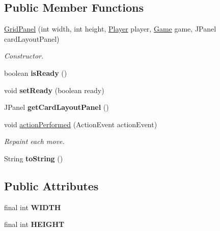 \subsection*{Public Member Functions}
\begin{DoxyCompactItemize}
\item 
\hyperlink{classGridPanel_a0b8f0e5a4913536e371ae84517bec8f7}{Grid\+Panel} (int width, int height, \hyperlink{classPlayer}{Player} player, \hyperlink{classGame}{Game} game, J\+Panel card\+Layout\+Panel)
\begin{DoxyCompactList}\small\item\em Constructor. \end{DoxyCompactList}\item 
boolean {\bfseries is\+Ready} ()\hypertarget{classGridPanel_aae632b11eaed927afd5884f99a5870f8}{}\label{classGridPanel_aae632b11eaed927afd5884f99a5870f8}

\item 
void {\bfseries set\+Ready} (boolean ready)\hypertarget{classGridPanel_a09c32b26eae81ac799aa95e28aae194f}{}\label{classGridPanel_a09c32b26eae81ac799aa95e28aae194f}

\item 
J\+Panel {\bfseries get\+Card\+Layout\+Panel} ()\hypertarget{classGridPanel_a1a8601fc7d4f8175c7aebd6bec8ec6f9}{}\label{classGridPanel_a1a8601fc7d4f8175c7aebd6bec8ec6f9}

\item 
void \hyperlink{classGridPanel_a38f9375b4ed14fa70edaa859b0ed43e6}{action\+Performed} (Action\+Event action\+Event)\hypertarget{classGridPanel_a38f9375b4ed14fa70edaa859b0ed43e6}{}\label{classGridPanel_a38f9375b4ed14fa70edaa859b0ed43e6}

\begin{DoxyCompactList}\small\item\em Repaint each move. \end{DoxyCompactList}\item 
String {\bfseries to\+String} ()\hypertarget{classGridPanel_a7dbc1ff2bf786538707f479837ce2792}{}\label{classGridPanel_a7dbc1ff2bf786538707f479837ce2792}

\end{DoxyCompactItemize}
\subsection*{Public Attributes}
\begin{DoxyCompactItemize}
\item 
final int {\bfseries W\+I\+D\+TH}\hypertarget{classGridPanel_a0ad964f4019fe73ca89797e3b2ba6801}{}\label{classGridPanel_a0ad964f4019fe73ca89797e3b2ba6801}

\item 
final int {\bfseries H\+E\+I\+G\+HT}\hypertarget{classGridPanel_a1a9b96aea68e7aa0b30ae9663760bb97}{}\label{classGridPanel_a1a9b96aea68e7aa0b30ae9663760bb97}

\end{DoxyCompactItemize}
